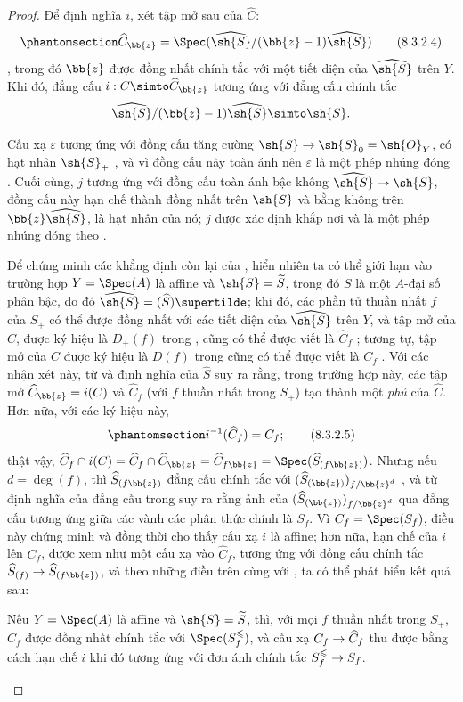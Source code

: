 \documentclass[oneside,10pt]{amsart}
\makeatletter
\renewcommand{\leq}{\leqslant}
\newcommand{\ega@arrow}[2]{\mathchoice{#1}{#2}{#2}{#2}}
\renewcommand{\to}{\ega@arrow{\longrightarrow}{\rightarrow}}
\let\EGAOriginalLabel\label
\renewcommand{\label}[1]{\phantomsection\EGAOriginalLabel{#1}}
\makeatother
\begin{document}
\begin{proof}
Để định nghĩa $i$, xét tập mở sau của $\widehat{C}$:
\[
\label{II.8.3.2.4}
  \widehat{C}_{\bb{z}} = \Spec(\widehat{\sh{S}}/(\bb{z}-1)\widehat{\sh{S}})
\tag{8.3.2.4}
\]
, trong đó $\bb{z}$ được đồng nhất chính tắc với một tiết diện của $\widehat{\sh{S}}$ trên $Y$.
Khi đó, đẳng cấu $i: C\simto\widehat{C}_{\bb{z}}$ tương ứng với đẳng cấu chính tắc 
\[
  \widehat{\sh{S}}/(\bb{z}-1)\widehat{\sh{S}} \simto \sh{S}.
\]

Cấu xạ $\varepsilon$ tương ứng với đồng cấu tăng cường $\sh{S}\to\sh{S}_0=\sh{O}_Y$, có hạt nhân $\sh{S}_+$ , và vì đồng cấu này toàn ánh nên $\varepsilon$ là một phép nhúng đóng .
Cuối cùng, $j$ tương ứng  với đồng cấu toàn ánh bậc không $\widehat{\sh{S}}\to\sh{S}$, đồng cấu này hạn chế thành đồng nhất trên $\sh{S}$ và bằng không trên $\bb{z}\widehat{\sh{S}}$, là hạt nhân của nó;
$j$ được xác định khắp nơi và là một phép nhúng đóng theo .

Để chứng minh các khẳng định còn lại của , hiển nhiên ta có thể giới hạn vào trường hợp $Y=\Spec(A)$ là affine và $\sh{S}=\widetilde{S}$, trong đó $S$ là một $A$-đại số phân bậc, do đó $\widehat{\sh{S}}=(\widehat{S})\supertilde$;
khi đó, các phần tử thuần nhất $f$ của $S_+$ có thể được đồng nhất với các tiết diện của $\widehat{\sh{S}}$ trên $Y$, và tập mở của $\widehat{C}$, được ký hiệu là $D_+(f)$ trong , cũng có thể được viết là $\widehat{C}_f$ ;
tương tự, tập mở của $C$ được ký hiệu là $D(f)$ trong  cũng có thể được viết là $C_f$ .
Với các nhận xét này, từ  và định nghĩa của $\widehat{S}$ suy ra rằng, trong trường hợp này, các tập mở $\widehat{C}_{\bb{z}}=i(C)$ và $\widehat{C}_f$ (với $f$ thuần nhất trong $S_+$) tạo thành một \emph{phủ} của $\widehat{C}$.
Hơn nữa, với các ký hiệu này,
\[
\label{II.8.3.2.5}
  i^{-1}(\widehat{C}_f) = C_f;
\tag{8.3.2.5}
\]
thật vậy, $\widehat{C}_f\cap i(C) = \widehat{C}_f\cap\widehat{C}_{\bb{z}} = \widehat{C}_{f\bb{z}} = \Spec(\widehat{S}_{(f\bb{z})})$.
Nhưng nếu $d=\deg(f)$, thì $\widehat{S}_{(f\bb{z})}$ đẳng cấu chính tắc với $(\widehat{S}_{(\bb{z})})_{f/\bb{z}^d}$ , và từ định nghĩa của đẳng cấu trong  suy ra rằng ảnh của $(\widehat{S}_{(\bb{z})})_{f/\bb{z}^d}$ qua đẳng cấu tương ứng giữa các vành các phân thức chính là $S_f$.
Vì $C_f=\Spec(S_f)$, điều này chứng minh  và đồng thời cho thấy cấu xạ $i$ là affine;
hơn nữa, hạn chế của $i$ lên $C_f$, được xem như một cấu xạ vào $\widehat{C}_f$, tương ứng  với đồng cấu chính tắc $\widehat{S}_{(f)}\to\widehat{S}_{(f\bb{z})}$, và theo những điều trên cùng với , ta có thể phát biểu kết quả sau:
\begin{env}[8.3.2.6]
\label{II.8.3.2.6}
Nếu $Y=\Spec(A)$ là affine và $\sh{S}=\widetilde{S}$, thì, với mọi $f$ thuần nhất trong $S_+$, $\widehat{C}_f$ được đồng nhất chính tắc với $\Spec(S_f^\leq)$, và cấu xạ $C_f\to\widehat{C}_f$ thu được bằng cách hạn chế $i$ khi đó tương ứng với đơn ánh chính tắc $S_f^\leq\to S_f$.
\end{env}


\end{proof}
\end{document}
